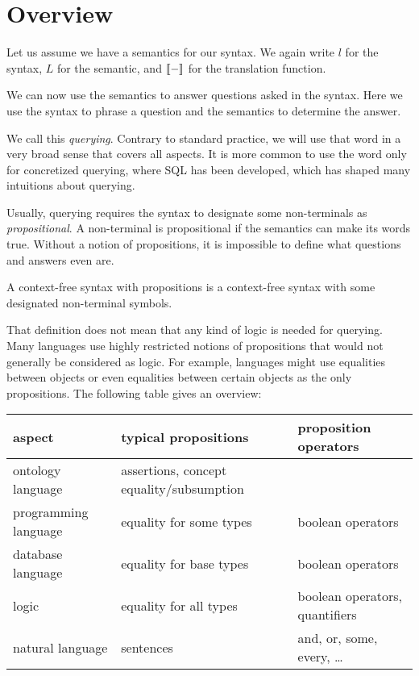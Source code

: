 \section{Overview}

Let us assume we have a semantics for our syntax.
We again write $l$ for the syntax, $L$ for the semantic, and $\llbracket -\rrbracket$ for the translation function.

We can now use the semantics to answer questions asked in the syntax.
Here we use the syntax to phrase a question and the semantics to determine the answer.

We call this \emph{querying}.
Contrary to standard practice, we will use that word in a very broad sense that covers all aspects.
It is more common to use the word only for concretized querying, where SQL has been developed, which has shaped many intuitions about querying.

Usually, querying requires the syntax to designate some non-terminals as \emph{propositional}.
A non-terminal is propositional if the semantics can make its words true.
Without a notion of propositions, it is impossible to define what questions and answers even are.

\begin{definition}[Propositions]
A context-free syntax with propositions is a context-free syntax with some designated non-terminal symbols.
\end{definition}

That definition does not mean that any kind of logic is needed for querying.
Many languages use highly restricted notions of propositions that would not generally be considered as logic.
For example, languages might use equalities between objects or even equalities between certain objects as the only propositions.
The following table gives an overview:

\begin{center}
\begin{tabular}{l|l|l}
aspect & typical propositions & proposition operators\\
\hline
ontology language & assertions, concept equality/subsumption &\\
programming language & equality for some types &  boolean operators\\
database language & equality for base types &  boolean operators \\
logic & equality for all types & boolean operators, quantifiers\\
natural language & sentences & and, or, some, every, \ldots\\
\end{tabular}
\end{center}

